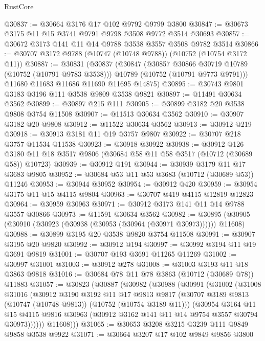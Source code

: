 \begin{lexlean}{RustCore}
\begin{coremodule}
@30837 := @30664 @3176 @17 @102 @9792 @9799 @3800
@30847 := @30673 @3175 @11 @15 @3741 @9791 @9798 @3508 @9772 @3514 @30693
@30857 := @30672 @3173 @141 @11 @14 @9788 @3538 @3557 @3508 @9782 @3514
@30866 := @30707 @3172 @9788 (@10747 (@10748 @9788)) (@10752 (@10754 @3172 @11))
@30887 := @30831
    (@30837
      (@30847
        (@30857 @30866 @30719 @10789 (@10752 (@10791 @9783 @3538)))
        @10789
        (@10752 (@10791 @9773 @9791)))
      @11680
      @11683
      @11686
      @11690
      @11695
      @14875)
@30895 := @30743 @9801 @3183 @3196 @111 @3538 @9809 @3538 @9821
@30897 := @11491 @30634 @3562
@30899 := @30897 @215 @111
@30905 := @30899 @3182 @20 @3538 @9808 @3754 @11508
@30907 := @11513 @30634 @3562
@30910 := @30907 @3182 @20 @9808
@30912 := @11522 @30634 @3562
@30913 := @30912 @219
@30918 := @30913 @3181 @11 @19 @3757 @9807
@30922 := @30707 @218 @3757 @11534 @11538
@30923 := @30918 @30922
@30938 := @30912
    @126
    @3180
    @11
    @18
    @3517
    @9806
    (@30684 @58 @11 @58 @3517 (@10712 (@30689 @58)) @10723)
@30939 := @30912 @191
@30944 := @30939 @3179 @11 @17 @3683 @9805
@30952 := @30684 @53 @11 @53 @3683 (@10712 (@30689 @53)) @11246
@30953 := @30944 @30952
@30954 := @30912 @420
@30959 := @30954 @3175 @11 @15 @4115 @9804
@30963 := @30707 @419 @4115 @12819 @12823
@30964 := @30959 @30963
@30971 := @30912 @3173 @141 @11 @14 @9788 @3557 @30866
@30973 := @11591 @30634 @3562
@30982 := @30895 (@30905 (@30910 (@30923 (@30938 (@30953 (@30964 (@30971 @30973)))))) @11608)
@30988 := @30899 @3195 @20 @3538 @9820 @3754 @11508
@30991 := @30907 @3195 @20 @9820
@30992 := @30912 @194
@30997 := @30992 @3194 @11 @19 @3691 @9819
@31001 := @30707 @193 @3691 @11265 @11269
@31002 := @30997 @31001
@31003 := @30912 @278
@31008 := @31003 @3193 @11 @18 @3863 @9818
@31016 := @30684 @78 @11 @78 @3863 (@10712 (@30689 @78)) @11883
@31057 := @30823
    (@30887
      (@30982
        (@30988
          (@30991
            (@31002
              (@31008
                @31016
                (@30912
                  @3190
                  @3192
                  @11
                  @17
                  @9813
                  @9817
                  (@30707 @3189 @9813 (@10747 (@10748 @9813)) (@10752 (@10754 @3189 @11)))
                  (@30954
                    @3164
                    @11
                    @15
                    @4115
                    @9816
                    @30963
                    (@30912 @3162 @141 @11 @14 @9754 @3557 @30794 @30973))))))
          @11608)))
@31065 := @30653 @3208 @3215 @3239 @111 @9849 @9858 @3538 @9922
@31071 := @30664 @3207 @17 @102 @9849 @9856 @3800

\end{coremodule}
\end{lexlean}
